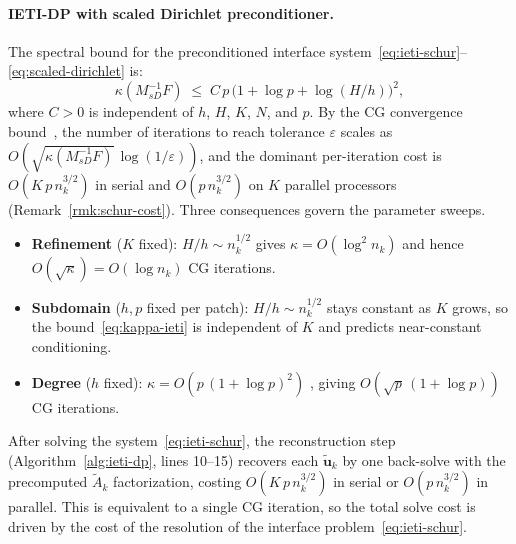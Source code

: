 \documentclass{article}
\newcommand{\vect}[1]{\boldsymbol{#1}}
\newcommand{\Aaug}[1]{\widetilde{A}_{#1}}        %
\newcommand{\uaug}[1]{\widetilde{\vect{u}}_{#1}} %
\theoremstyle{plain}
\numberwithin{equation}{section}
\begin{document}
\paragraph{IETI-DP with scaled Dirichlet preconditioner.}
The spectral bound for the preconditioned interface
system~\eqref{eq:ieti-schur}--\eqref{eq:scaled-dirichlet}
\cite{schneckenleitner2020condition} is:
\begin{equation}
    \kappa\!\left(M_{sD}^{-1}F\right)
    \;\leq\; C\,p\,\bigl(1+\log p+\log(H/h)\bigr)^{2},
    \label{eq:kappa-ieti}
\end{equation}
where $C>0$ is independent of $h$, $H$, $K$, $N$, and $p$.
By the CG convergence bound~\cite[Thm.~6.29]{saad2003iterative}, the number of iterations to
reach tolerance $\varepsilon$ scales as
$O\!\left(\sqrt{\kappa(M_{sD}^{-1}F)}\,\log(1/\varepsilon)\right)$,
and the dominant per-iteration cost is $O(K\,p\,n_k^{3/2})$ in serial
and $O(p\,n_k^{3/2})$ on $K$ parallel processors (Remark~\ref{rmk:schur-cost}).
Three consequences govern the parameter sweeps.
\begin{itemize}
    \item[(i)] \textbf{Refinement} ($K$ fixed): $H/h\sim n_k^{1/2}$
          gives $\kappa=O(\log^{2}n_k)$ and hence $O\!\left(\sqrt{\kappa}\right)=O(\log n_k)$ CG iterations.
    \item[(ii)] \textbf{Subdomain} ($h,p$ fixed per patch): $H/h\sim n_k^{1/2}$
          stays constant as $K$ grows, so the bound~\eqref{eq:kappa-ieti} is
          independent of $K$ and predicts near-constant conditioning.
    \item[(iii)] \textbf{Degree} ($h$ fixed):
          $\kappa=O\!\left(p\,(1+\log p)^{2}\right)$ \cite{schneckenleitner2020condition},
          giving $O\!\left(\sqrt{p}\,(1+\log p)\right)$ CG iterations.
\end{itemize}

After solving the system~\eqref{eq:ieti-schur}, the reconstruction step (Algorithm~\ref{alg:ieti-dp}, lines 10--15)
recovers each $\uaug{k}$ by one back-solve with the precomputed $\Aaug{k}$
factorization, costing $O(K\,p\,n_k^{3/2})$ in serial or $O(p\,n_k^{3/2})$
in parallel. This is equivalent to a single CG iteration, so the total solve cost is driven by
the cost of the resolution of the interface problem~\eqref{eq:ieti-schur}.
\end{document}
